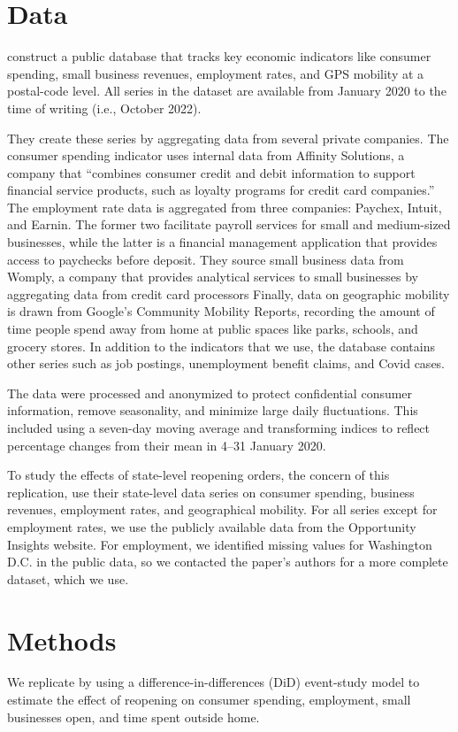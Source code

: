 \documentclass[12pt,letterpaper]{article}
\begin{document}
\section*{Data}
\citeauthor{Chetty2020} construct a public database that tracks key economic indicators like consumer spending, small business revenues, employment rates, and GPS mobility at a postal-code level. All series in the dataset are available from January 2020 to the time of writing (i.e., October 2022). 

They create these series by aggregating data from several private companies. The consumer spending indicator uses internal data from Affinity Solutions, a company that “combines consumer credit and debit information to support financial service products, such as loyalty programs for credit card companies.” The employment rate data is aggregated from three companies: Paychex, Intuit, and Earnin. The former two facilitate payroll services for small and medium-sized businesses, while the latter is a financial management application that provides access to paychecks before deposit. They source small business data  from Womply, a company that provides analytical services to small businesses by aggregating data from credit card processors Finally, data on geographic mobility is drawn from Google’s Community Mobility Reports, recording the amount of time people spend away from home at public spaces like parks, schools, and grocery stores. In addition to the indicators that we use, the database contains other series such as job postings, unemployment benefit claims, and Covid cases.

The data were processed and anonymized to protect confidential consumer information, remove seasonality, and minimize large daily fluctuations. This included using a seven-day moving average and transforming indices to reflect percentage changes from their mean in 4–31 January 2020.  

To study the effects of state-level reopening orders, the concern of this replication, \citeauthor{Chetty2020} use their state-level data series on consumer spending, business revenues, employment rates, and geographical mobility. For all series except for employment rates, we use the publicly available data from the Opportunity Insights website. For employment, we identified missing values for Washington D.C. in the public data, so we contacted the paper’s authors for a more complete dataset, which we use.

\section*{Methods}
We replicate \citeauthor{Chetty2020} by using a difference-in-differences (DiD) event-study model to estimate the effect of reopening on consumer spending, employment, small businesses open, and time spent outside home. 
\end{document}
